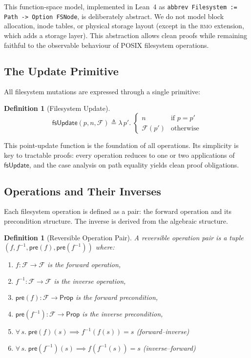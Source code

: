 \documentclass[11pt,a4paper]{article}
\newtheorem{definition}[theorem]{Definition}
\newcommand{\FS}{\mathcal{F}}
\newcommand{\inv}[1]{#1^{-1}}
\newcommand{\pre}[1]{\mathsf{pre}(#1)}
\newcommand{\rmo}{\textsc{rmo}}
\newcommand{\lean}{Lean~4}
\begin{document}
This function-space model, implemented in \lean{} as \lstinline[style=leanstyle]{abbrev Filesystem := Path -> Option FSNode}, is deliberately abstract. We do not model block allocation, inode tables, or physical storage layout (except in the \rmo{} extension, which adds a storage layer). This abstraction allows clean proofs while remaining faithful to the observable behaviour of POSIX filesystem operations.

\subsection{The Update Primitive}

All filesystem mutations are expressed through a single primitive:

\begin{definition}[Filesystem Update]
\label{def:fsupdate}
\[
  \mathsf{fsUpdate}(p, n, \FS) \triangleq
    \lambda\, p'.\; \begin{cases}
      n          & \text{if } p = p' \\
      \FS(p')    & \text{otherwise}
    \end{cases}
\]
\end{definition}

This point-update function is the foundation of all operations. Its simplicity
is key to tractable proofs: every operation reduces to one or two applications
of $\mathsf{fsUpdate}$, and the case analysis on path equality yields clean
proof obligations.

\subsection{Operations and Their Inverses}

Each filesystem operation is defined as a pair: the forward operation and its
precondition structure. The inverse is derived from the algebraic structure.

\begin{definition}[Reversible Operation Pair]
\label{def:oppair}
A \emph{reversible operation pair} is a tuple
$(f, \inv{f}, \pre{f}, \pre{\inv{f}})$ where:
\begin{enumerate}[label=(\roman*)]
  \item $f : \FS \to \FS$ is the forward operation,
  \item $\inv{f} : \FS \to \FS$ is the inverse operation,
  \item $\pre{f} : \FS \to \mathsf{Prop}$ is the forward precondition,
  \item $\pre{\inv{f}} : \FS \to \mathsf{Prop}$ is the inverse precondition,
  \item $\forall\, s.\; \pre{f}(s) \implies \inv{f}(f(s)) = s$
        \hfill (forward--inverse)
  \item $\forall\, s.\; \pre{\inv{f}}(s) \implies f(\inv{f}(s)) = s$
        \hfill (inverse--forward)
\end{enumerate}
\end{definition}
\end{document}
